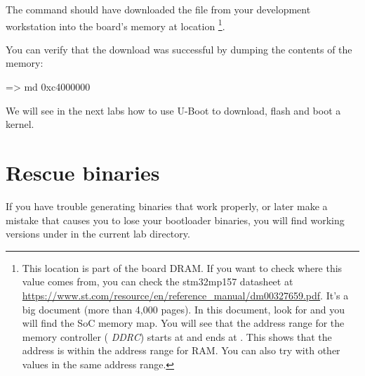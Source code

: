 The  command should have downloaded the
 file from your development workstation into
the board's memory at location \footnote{
This location is part of the board DRAM. If you want
to check where this value comes from, you can check the stm32mp157
datasheet at
\url{https://www.st.com/resource/en/reference_manual/dm00327659.pdf}.
It's a big document (more than 4,000 pages). In this document, look
for  and you will find the SoC memory map.
You will see that the address range for the memory controller ({\em
DDRC}) starts at  and ends at . This
shows that the  address is within the address range
for RAM. You can also try with other values in the same address range.}.

You can verify that the download was successful by dumping the
contents of the memory:

\begin{ubootinput}
=> md 0xc4000000
\end{ubootinput}

We will see in the next labs how to use U-Boot to download, flash and
boot a kernel.



\section{Rescue binaries}

If you have trouble generating binaries that work properly, or later
make a mistake that causes you to lose your bootloader binaries, you
will find working versions under  in the current lab
directory.
